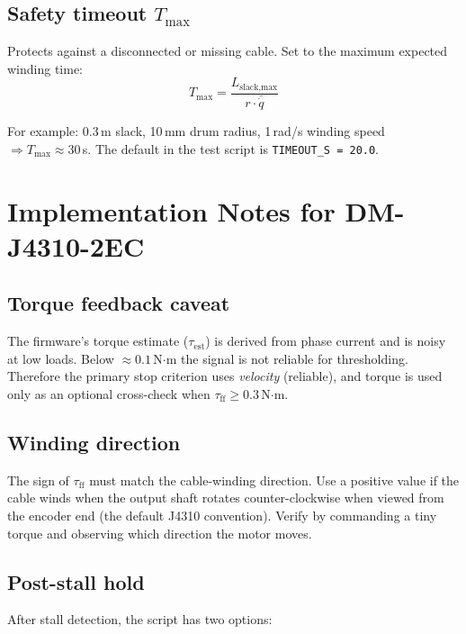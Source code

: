 \documentclass[11pt,a4paper]{article}
\begin{document}
\subsection{Safety timeout $T_\text{max}$}

Protects against a disconnected or missing cable.  Set to the maximum
expected winding time:
\[
  T_\text{max} = \frac{L_\text{slack,max}}{r \cdot \bar{\dot{q}}}
\]

For example: 0.3\,m slack, 10\,mm drum radius, 1\,rad/s winding speed
$\Rightarrow T_\text{max} \approx 30$\,s.  The default in the test script
is \texttt{TIMEOUT\_S = 20.0}.

\section{Implementation Notes for DM-J4310-2EC}
\label{sec:impl}

\subsection{Torque feedback caveat}

The firmware's torque estimate ($\tau_\text{est}$) is derived from
phase current and is noisy at low loads.  Below $\approx 0.1$\,N$\cdot$m
the signal is not reliable for thresholding.  Therefore the primary stop
criterion uses \emph{velocity} (reliable), and torque is used only as an
optional cross-check when $\tau_\text{ff} \geq 0.3$\,N$\cdot$m.

\subsection{Winding direction}

The sign of $\tau_\text{ff}$ must match the cable-winding direction.
Use a positive value if the cable winds when the output shaft rotates
counter-clockwise when viewed from the encoder end (the default J4310
convention).  Verify by commanding a tiny torque and observing which
direction the motor moves.

\subsection{Post-stall hold}

After stall detection, the script has two options:
\end{document}
